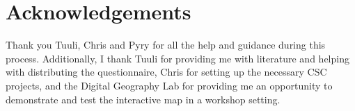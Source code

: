 \section*{Acknowledgements}

Thank you Tuuli, Chris and Pyry for all the help and guidance during this process.
Additionally,
I thank Tuuli for providing me with literature and
helping with distributing the questionnaire,
Chris for setting up the necessary CSC projects,
and the Digital Geography Lab for providing me an opportunity to demonstrate and test the
interactive map in a workshop setting.
